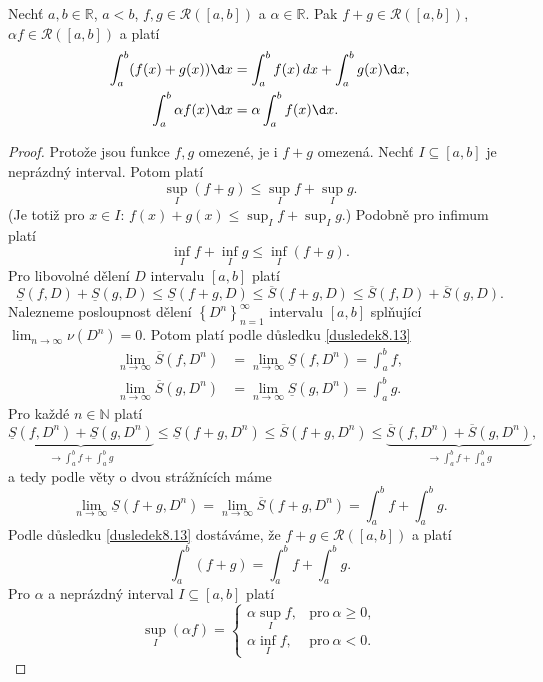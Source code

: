 \begin{veta}\label{veta8.18}
Nechť $a,b \in \mathbb{R}$, $a<b$, $f,g \in \mathcal R([a,b])$ a $\alpha \in \mathbb{R}$. Pak $f+g \in \mathcal R([a,b])$, $\alpha f \in \mathcal R([a,b])$ a platí
\begin{align*}
\int_a^b (f(x) + g(x))\d x &= \int_a^b f(x)\,dx + \int_a^b g(x)\d x,\\
\int_a^b \alpha f(x)\d x &= \alpha \int_a^b f(x)\d x.
\end{align*}
\end{veta}

\begin{proof}
	Protože jsou funkce $f,g$ omezené, je i $f+g$ omezená. Nechť $I\subseteq [a,b]$ je neprázdný interval.
	Potom platí
	$$
	\sup_I (f+g) \leq \sup_I f+ \sup_I g.
	$$
	(Je totiž pro $x\in I$: $f(x)+g(x)\leq \sup_I f + \sup_I g$.) Podobně pro infimum platí
	$$
	    \inf_I f + \inf_I g \leq \inf_I (f+g).
	$$
	Pro libovolné dělení $ D$ intervalu $[a,b]$ platí
	$$
	    \underline S(f,D)+\underline S(g,D)\leq\underline S(f+g,D) \leq \overline S(f+g,D)\leq \overline S(f,D)+\overline S(g,D).
	$$
	Nalezneme posloupnost dělení $\left \{  D^n \right \}_{n=1}^\infty $ intervalu $[a,b]$ splňující
	$\lim_{n\to \infty} \nu ( D^n)=0$. Potom platí podle důsledku \ref{dusledek8.13}
	\begin{align*}
        \lim_{n \to \infty} \overline S(f,D^n)&=\lim_{n \to \infty} \underline S(f,D^n)=\int_a^b f,\\
		\lim_{n \to \infty} \overline S(g,D^n)&=\lim_{n \to \infty} \underline S(g,D^n)=\int_a^b g.
	\end{align*}
	Pro každé $n\in \mathbb N $ platí
	$$
	    \underbrace{\underline S(f,D^n) + \underline S(g,D^n)}_{\to \int_a^b f +\int_a^b g}\leq \underline S(f+g,D^n) \leq \overline S(f+g,D^n)\leq \underbrace{\overline S(f,D^n)+ \overline S(g,D^n)}_{\to \int_a^b f + \int_a^b g},
	$$
	a tedy podle věty o dvou strážnících máme
	$$
 \lim_{n \to \infty} \underline S(f+g,D^n) = \lim_{n \to \infty} \overline S(f+g,D^n)=\int_a^b f + \int_a^b g.
	$$
	Podle důsledku \ref{dusledek8.13} dostáváme, že $f+g\in \mathcal R([a,b])$ a platí
	$$
	    \int_a^b (f+g) = \int_a^bf + \int _a^b g.
	$$
	Pro $\alpha$ a neprázdný interval $I\subseteq [a,b]$ platí
	$$
	    \sup_I (\alpha f) = \begin{cases}
						\alpha \sup _I f, & \text{pro} \ \alpha \geq 0,\\
						\alpha \inf _I f, & \text{pro} \ \alpha < 0.
					\end{cases}
$$
\end{proof}
